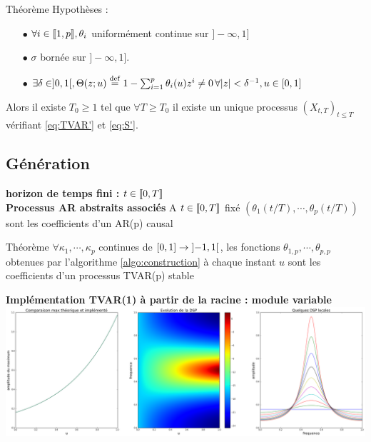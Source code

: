 \documentclass[11pt]{beamer}
\begin{document}
\begin{frame}
\begin{alertblock}{Théorème}
Hypothèses : 
\begin{itemize}
\item[$\bullet$] $\forall i\in {\left\llbracket 1,p \right\rrbracket}, \theta_i$ uniformément continue sur $]-\infty,1]$
\item[$\bullet$] $\sigma$ bornée sur $]-\infty,1]$. 
\item[$\bullet$] $\exists \delta \in ]0,1[, \Theta(z;u) \stackrel{\rm def}{=}  1 - \sum_{i=1}^p \theta_i(u) z^i \neq 0 \, \forall { \left| z \right|} < \delta^{-1}, u\in [0,1]$
\end{itemize}
Alors il existe $T_0 \geq 1$ tel que $\forall T \geq T_0$ il existe un unique processus $(X_{t,T})_{t\leq T}$ vérifiant \eqref{eq:TVAR'} et \eqref{eq:S'}.
\end{alertblock}
\end{frame}

\subsection{Génération}
\begin{frame}
\textbf{horizon de temps fini : } $t\in {\left\llbracket 0,T \right\rrbracket}$ \\
\textbf{Processus AR abstraits associés}
A $t\in {\left\llbracket 0,T \right\rrbracket}$ fixé $(\theta_1(t/T), \cdots , \theta_p(t/T))$ sont les coefficients d'un AR(p) causal 
\begin{alertblock}{Théorème}
$\forall \kappa_1, \cdots, \kappa_p$ continues de $[0,1]\to {\left] -1,1 \right[}$, les fonctions $\theta_{1,p},\cdots, \theta_{p,p}$ obtenues par l'algorithme \ref{algo:construction} à chaque instant $u$ sont les coefficients d'un processus TVAR(p) stable
\end{alertblock}
\end{frame}

\begin{frame}
\textbf{Implémentation TVAR(1) à partir de la racine : module variable}
\includegraphics[scale=0.19]{images/TVAR1_module.png}
\end{frame}
\end{document}
